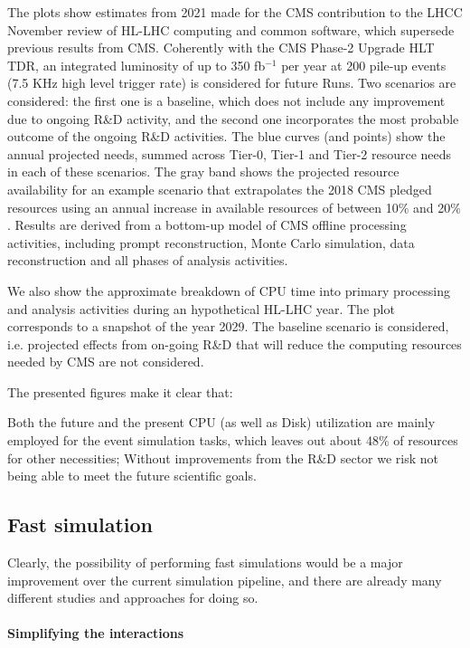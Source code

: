 The plots show estimates from 2021 made for the CMS contribution to the LHCC November review of HL-LHC computing and common software, which supersede previous results from CMS. Coherently with the CMS Phase-2 Upgrade HLT TDR, an integrated luminosity of up to 350 fb$^{-1}$ per year at 200 pile-up events (7.5 KHz high level trigger rate) is considered for future Runs. Two scenarios are considered: the first one is a baseline, which does not include any improvement due to ongoing R\&D activity, and the second one incorporates the most probable outcome of the ongoing R\&D activities. The blue curves (and points) show the annual projected needs, summed across Tier-0, Tier-1 and Tier-2 resource needs in each of these scenarios. The gray band shows the projected resource availability for an example scenario that extrapolates the 2018 CMS pledged resources using an annual increase in available resources of between 10$\%$ and 20$\%$. Results are derived from a bottom-up model of CMS offline processing activities, including prompt reconstruction, Monte Carlo simulation, data reconstruction and all phases of analysis activities. 

We also show the approximate breakdown of CPU time into primary processing and analysis activities during an hypothetical HL-LHC year. The plot corresponds to a snapshot of the year 2029. The baseline scenario is considered, i.e. projected effects from on-going R\&D that will reduce the computing resources needed by CMS are not considered.

The presented figures make it clear that:

\begin{outline}
    \1 Both the future and the present CPU (as well as Disk) utilization are mainly employed for the event simulation tasks, which leaves out about 48$\%$ of resources for other necessities;
    \1 Without improvements from the R\&D sector we risk not being able to meet the future scientific goals.
\end{outline}


\subsection{Fast simulation}\label{sec:fastsim}

Clearly, the possibility of performing fast simulations would be a major improvement over the current simulation pipeline, and there are already many different studies and approaches for doing so.

\paragraph{Simplifying the interactions}

